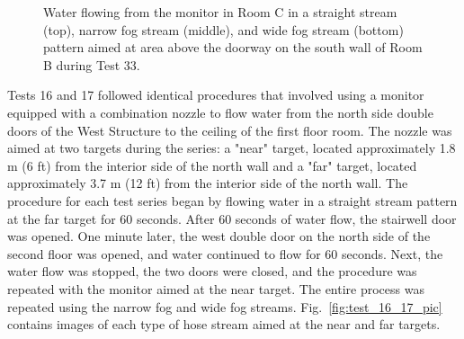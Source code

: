 \documentclass[12pt,oneside]{book}
\begin{document}
\begin{figure}[!ht]
\caption[Straight stream, narrow fog stream, and wide fog stream during Test 33.]{Water flowing from the monitor in Room C in a straight stream (top), narrow fog stream (middle), and wide fog stream (bottom) pattern aimed at area above the doorway on the south wall of Room B during Test 33.}
\label{fig:test_33_pic}
\end{figure}

Tests 16 and 17 followed identical procedures that involved using a monitor equipped with a combination nozzle to flow water from the north side double doors of the West Structure to the ceiling of the first floor room. The nozzle was aimed at two targets during the series: a "near" target, located approximately 1.8 m (6 ft) from the interior side of the north wall and a "far" target, located approximately 3.7 m (12 ft) from the interior side of the north wall. The procedure for each test series began by flowing water in a straight stream pattern at the far target for 60 seconds. After 60 seconds of water flow, the stairwell door was opened. One minute later, the west double door on the north side of the second floor was opened, and water continued to flow for 60 seconds. Next, the water flow was stopped, the two doors were closed, and the procedure was repeated with the monitor aimed at the near target. The entire process was repeated using the narrow fog and wide fog streams. Fig.~\ref{fig:test_16_17_pic} contains images of each type of hose stream aimed at the near and far targets.
\end{document}
